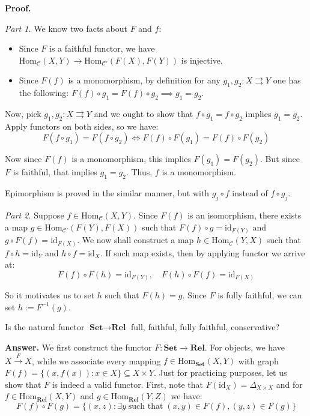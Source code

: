 \documentclass{category-template}
\begin{document}
\textbf{Proof.}

\textit{Part 1.} We know two facts about $F$ and $f$:
\begin{itemize}
    \item Since $F$ is a faithful functor, we have $\text{Hom}_{\mathcal{C}}(X,
    Y) \to \text{Hom}_{\mathcal{C}'}(F(X), F(Y))$ is injective.
    \item Since $F(f)$ is a monomorphism, by definition for any $g_1,g_2: X
    \rightrightarrows Y$ one has the following: $F(f) \circ g_1 = F(f) \circ g_2 \implies
    g_1=g_2$.
\end{itemize}

Now, pick $g_1,g_2: X \rightrightarrows Y$ and we ought to show that $f \circ
g_1 = f \circ g_2$ implies $g_1=g_2$. Apply functors on both sides, so we have:
\begin{equation*}
    F(f \circ g_1) = F(f \circ g_2) \iff F(f) \circ F(g_1) = F(f) \circ F(g_2)
\end{equation*}

Now since $F(f)$ is a monomorphism, this implies $F(g_1) = F(g_2)$. But since
$F$ is faithful, that implies $g_1=g_2$. Thus, $f$ is a monomorphism.

Epimorphism is proved in the similar manner, but with $g_j \circ f$ instead of
$f \circ g_j$.

\textit{Part 2.} Suppose $f \in \text{Hom}_{\mathcal{C}}(X,Y)$. Since $F(f)$ is
an isomorphism, there exists a map $g \in \text{Hom}_{\mathcal{C}'}(F(Y),F(X))$
such that $F(f) \circ g = \text{id}_{F(Y)}$ and $g \circ F(f) =
\text{id}_{F(X)}$. We now shall construct a map $h \in
\text{Hom}_{\mathcal{C}}(Y,X)$ such that $f \circ h = \text{id}_Y$ and $h \circ
f = \text{id}_X$. If such map exists, then by applying functor we arrive at:
\begin{equation*}
    F(f) \circ F(h) = \text{id}_{F(Y)}, \quad F(h) \circ F(f) = \text{id}_{F(X)}
\end{equation*}

So it motivates us to set $h$ such that $F(h) = g$. Since $F$ is fully faithful,
we can set $h := F^{-1}(g)$.

\begin{problem}
    Is the natural functor $\textbf{Set} \to \textbf{Rel}$ full, faithful, fully
    faithful, conservative?
\end{problem}

\textbf{Answer.} We first construct the functor $F: \textbf{Set} \to
\textbf{Rel}$. For objects, we have $X \xrightarrow{F} X$, while we associate
every mapping $f \in \text{Hom}_{\textbf{Set}}(X, Y)$ with graph $F(f) =
\{(x,f(x)): x \in X\} \subseteq X \times Y$. Just for practicing purposes, let
us show that $F$ is indeed a valid functor. First, note that $F(\text{id}_X) =
\Delta_{X \times X}$ and for $f \in \text{Hom}_{\textbf{Rel}}(X,Y)$ and 
$g \in \text{Hom}_{\textbf{Rel}}(Y,Z)$ we have:
\begin{equation*}
    F(f) \circ F(g) = \{(x,z): \exists y \; \text{such that} \; (x,y) \in F(f), (y,z) \in F(g)\}
\end{equation*}
\end{document}
